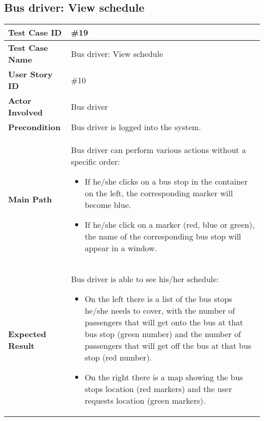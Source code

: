 \subsection{Bus driver: View schedule}
\begin{center}
	\begin{tabular} { | m{3.5cm} | m{9.5cm} | }
		\hline
		\textbf{Test Case ID} & \#19\\
		\hline
		\textbf{Test Case Name} & Bus driver: View schedule\\
		\hline
		\textbf{User Story ID} & \#10 \\
		\hline
		\textbf{Actor Involved} & Bus driver\\
		\hline
		\textbf{Precondition} & Bus driver is logged into the system.\\
		\hline
		\textbf{Main Path} & 
		Bus driver can perform various actions without a specific order:
			\begin{itemize}
				\item If he/she clicks on a bus stop in the container on the left, the corresponding marker will become blue.
				\item If he/she click on a marker (red, blue or green), the name of the corresponding bus stop will appear in a window.
			\end{itemize}\\
		\hline
		\textbf{Expected Result} & Bus driver is able to see his/her schedule: 
		\begin{itemize}
			\item On the left there is a list of the bus stops he/she needs to cover, with the number of passengers that will get onto the bus at that bus stop (green number) and the number of passengers that will get off the bus at that bus stop (red number).
			\item On the right there is a map showing the bus stops location (red markers) and the user requests location (green markers).
		\end{itemize}\\
		\hline
	\end{tabular}
\end{center}
\newpage
